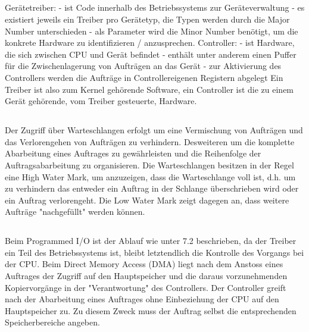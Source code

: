 \subsection{}
\begin{answer}
Gerätetreiber:
- ist Code innerhalb des Betriebssystems zur Geräteverwaltung
- es existiert jeweils ein Treiber pro Gerätetyp, die Typen werden durch die Major Number unterschieden
- als Parameter wird die Minor Number benötigt, um die konkrete Hardware zu identifizieren /
anzusprechen. Controller:
- ist Hardware, die sich zwischen CPU und Gerät befindet
- enthält unter anderem einen Puffer für die Zwischenlagerung von Aufträgen an das Gerät
- zur Aktivierung des Controllers werden die Aufträge in Controllereigenen Registern abgelegt
Ein Treiber ist also zum Kernel gehörende Software, ein Controller ist die zu einem Gerät gehörende,
vom Treiber gesteuerte, Hardware.
\end{answer}

\subsection{}
\begin{answer}
Der Zugriff über Warteschlangen erfolgt um eine Vermischung von Aufträgen und das Verlorengehen von Aufträgen zu verhindern. Desweiteren um die komplette Abarbeitung eines Auftrages zu gewährleisten und die Reihenfolge der Auftragsabarbeitung zu organisieren.
Die Warteschlangen besitzen in der Regel eine High Water Mark, um anzuzeigen, dass die Warteschlange voll ist, d.h. um zu verhindern das entweder ein Auftrag in der Schlange überschrieben wird oder ein Auftrag verlorengeht. Die Low Water Mark zeigt dagegen an, dass weitere Aufträge "nachgefüllt" werden können.
\end{answer}

\subsection{}
\begin{answer}
Beim Programmed
I/O ist der Ablauf wie unter 7.2 beschrieben, da der Treiber ein Teil des Betriebssystems ist, bleibt letztendlich die Kontrolle des Vorgangs bei der CPU. Beim Direct Memory Access (DMA) liegt nach dem Anstoss eines Auftrages der Zugriff auf den
Hauptspeicher und die daraus vorzunehmenden Kopiervorgänge in der "Verantwortung" des Controllers.
Der Controller greift nach der Abarbeitung eines Auftrages ohne Einbeziehung der CPU
auf den Hauptspeicher zu. Zu diesem Zweck muss der Auftrag selbst die entsprechenden Speicherbereiche
angeben.
\end{answer}

